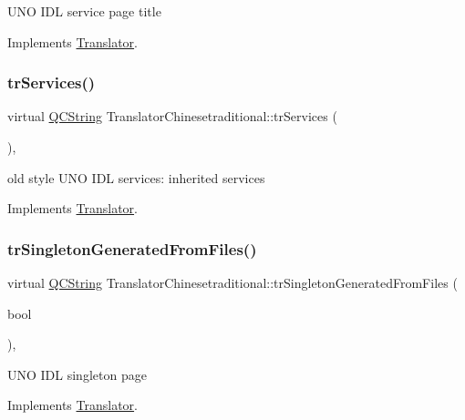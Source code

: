 U\+NO I\+DL service page title 

Implements \mbox{\hyperlink{class_translator}{Translator}}.

\mbox{\label{class_translator_chinesetraditional_a0fed5291443bec412ebc9090507552a0}} 
\subsubsection{\texorpdfstring{trServices()}{trServices()}}
{\footnotesize\ttfamily virtual \mbox{\hyperlink{class_q_c_string}{Q\+C\+String}} Translator\+Chinesetraditional\+::tr\+Services (\begin{DoxyParamCaption}{ }\end{DoxyParamCaption})\hspace{0.3cm}{\ttfamily [inline]}, {\ttfamily [virtual]}}

old style U\+NO I\+DL services\+: inherited services 

Implements \mbox{\hyperlink{class_translator}{Translator}}.

\mbox{\label{class_translator_chinesetraditional_a60900998951da84cb71da00b797a3648}} 
\subsubsection{\texorpdfstring{trSingletonGeneratedFromFiles()}{trSingletonGeneratedFromFiles()}}
{\footnotesize\ttfamily virtual \mbox{\hyperlink{class_q_c_string}{Q\+C\+String}} Translator\+Chinesetraditional\+::tr\+Singleton\+Generated\+From\+Files (\begin{DoxyParamCaption}\item[{bool}]{ }\end{DoxyParamCaption})\hspace{0.3cm}{\ttfamily [inline]}, {\ttfamily [virtual]}}

U\+NO I\+DL singleton page 

Implements \mbox{\hyperlink{class_translator}{Translator}}.

